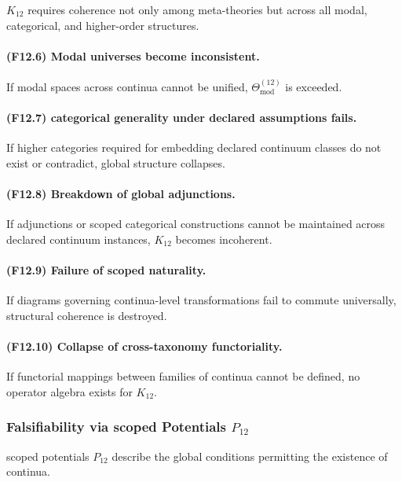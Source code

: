 $K_{12}$ requires coherence not only among meta-theories but across all
modal, categorical, and higher-order structures.

\paragraph{(F12.6) Modal universes become inconsistent.}
If modal spaces across continua cannot be unified,
$\Theta_{\mathrm{mod}}^{(12)}$ is exceeded.

\paragraph{(F12.7) categorical generality under declared assumptions fails.}
If higher categories required for embedding declared continuum classes do not exist or
contradict, global structure collapses.

\paragraph{(F12.8) Breakdown of global adjunctions.}
If adjunctions or scoped categorical constructions cannot be
maintained across declared continuum instances, $K_{12}$ becomes incoherent.

\paragraph{(F12.9) Failure of scoped naturality.}
If diagrams governing continua-level transformations fail to commute
universally, structural coherence is destroyed.

\paragraph{(F12.10) Collapse of cross-taxonomy functoriality.}
If functorial mappings between families of continua cannot be defined,
no operator algebra exists for $K_{12}$.



\subsubsection{Falsifiability via scoped Potentials $P_{12}$}

scoped potentials $P_{12}$ describe the global conditions permitting
the existence of continua.

